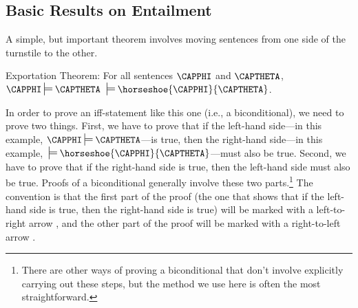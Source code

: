 \subsection{Basic Results on Entailment}\label{Basic Results on Entailment} 
A simple, but important theorem involves moving sentences from one side of the turnstile to the other.
\begin{THEOREM}{ \GSL{} Exportation Theorem:} For all \GSL{} sentences $\CAPPHI$ and $\CAPTHETA$, $\CAPPHI\sdtstile{}{}\CAPTHETA$ \Iff $\:\sdtstile{}{}\horseshoe{\CAPPHI}{\CAPTHETA}$.
\end{THEOREM}
\noindent{}In order to prove an iff-statement like this one (i.e., a biconditional), we need to prove two things. 
First, we have to prove that if the left-hand side---in this example, $\CAPPHI\sdtstile{}{}\CAPTHETA$---is true, then the right-hand side---in this example, $\:\sdtstile{}{}\horseshoe{\CAPPHI}{\CAPTHETA}$---must also be true. 
Second, we have to prove that if the right-hand side is true, then the left-hand side must also be true. 
Proofs of a biconditional generally involve these two parts.\footnote{There are other ways of proving a biconditional that don't involve explicitly carrying out these steps, but the method we use here is often the most straightforward.} 
The convention is that the first part of the proof (the one that shows that if the left-hand side is true, then the right-hand side is true) will be marked with a left-to-right arrow \mention{$\Rightarrow$},\index{$\Leftarrow$, $\Rightarrow$} and the other part of the proof will be marked with a right-to-left arrow \mention{$\Leftarrow$}. 
